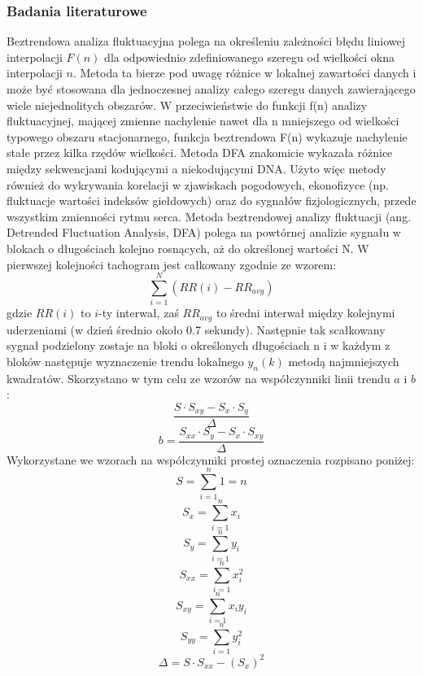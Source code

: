 \documentclass[a4paper, 11pt]{article}
\begin{document}
\subsubsection{Badania literaturowe}
\label{sec:dfa:papers}
Beztrendowa analiza fluktuacyjna polega na określeniu zależności błędu liniowej interpolacji $F(n)$ dla odpowiednio zdefiniowanego szeregu od wielkości okna interpolacji $n$. Metoda ta bierze pod uwagę różnice w lokalnej zawartości danych i może być stosowana dla jednoczesnej analizy całego szeregu danych zawierającego wiele niejednolitych obszarów. W przeciwieństwie do funkcji f(n) analizy fluktuacyjnej, mającej zmienne nachylenie nawet dla n mniejszego od wielkości typowego obszaru stacjonarnego, funkcja beztrendowa F(n) wykazuje nachylenie stałe przez kilka rzędów wielkości. Metoda DFA znakomicie wykazała  różnice między sekwencjami kodującymi a niekodującymi DNA. Użyto więc metody również do wykrywania korelacji w zjawiskach pogodowych, ekonofizyce (np. fluktuacje wartości indeksów giełdowych) oraz do sygnałów fizjologicznych, przede wszystkim zmienności rytmu serca.
Metoda beztrendowej analizy fluktuacji (ang. Detrended Fluctuation Analysis, DFA) polega
na powtórnej analizie sygnału w blokach o długościach kolejno rosnących, aż do określonej
wartości N. W pierwszej kolejności tachogram jest całkowany zgodnie ze wzorem:
\begin{equation}
\sum_{i=1}^{N}({RR(i)-RR_{avg}})
\end{equation}
gdzie $RR(i)$ to $i$-ty interwał, zaś $RR_{avg}$ to średni interwał między kolejnymi uderzeniami (w dzień średnio około 0.7 sekundy).
Następnie tak scałkowany sygnał podzielony zostaje na bloki o określonych długościach n
i w każdym z bloków następuje wyznaczenie trendu lokalnego $y_n(k)$ metodą najmniejszych kwadratów. Skorzystano w tym celu ze wzorów na współczynniki linii trendu $a$ i $b$:
\begin{equation}
 \frac {S \cdot S_{xy} - S_x\cdot S_{y}}{\Delta}
\end{equation}
\begin{equation}
b = \frac {S_{xx} \cdot S_y - S_x\cdot S_{xy}}{\Delta}
\end{equation}
Wykorzystane we wzorach na współczynniki prostej oznaczenia rozpisano poniżej:
\begin{equation}
S = \sum_{i=1}^n 1 = n
\end{equation}
\begin{equation}
S_x = \sum_{i=1}^n x_i
\end{equation}
\begin{equation}
S_y = \sum_{i=1}^n y_i
\end{equation}
\begin{equation}
S_{xx} = \sum_{i=1}^n x_i^2
\end{equation}
\begin{equation}
S_{xy} = \sum_{i=1}^n x_i y_i
\end{equation}
\begin{equation}
S_{yy} = \sum_{i=1}^n y_i^2
\end{equation}
\begin{equation}
\Delta = S \cdot S_{xx} - (S_x)^2
\end{equation}
\end{document}
